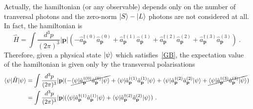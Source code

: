     Actually, the hamiltonian (or any observable) depends only on the number of tranversal photons and the zero-norm $\vert S\rangle - \vert L\rangle$ photons are not considered at all. In fact, the hamiltonian is 
    \begin{equation*}
        \hat H = \int \frac{d^3 p}{(2\pi)^3} |\mathbf p| ( - \hat a_{\mathbf p}^{\dagger (0)} \hat a_{\mathbf p}^{(0)} + \hat a_{\mathbf p}^{\dagger (1)} \hat a_{\mathbf p}^{(1)} + \hat a_{\mathbf p}^{\dagger (2)} \hat a_{\mathbf p}^{(2)} + \hat a_{\mathbf p}^{\dagger (3)} \hat a_{\mathbf p}^{(3)})  ~.
    \end{equation*}
    Therefore, given a physical state $\vert\psi\rangle$ which satisfies~\eqref{GB}, the expectation value of the hamiltonian is given only by the transversal polarisations
    \begin{equation*}
    \begin{aligned}
        \langle\psi\vert \hat H \vert\psi\rangle & = \int \frac{d^3 p}{(2\pi)^3} |\mathbf p| ( - \cancel{\langle\psi\vert \hat a_{\mathbf p}^{\dagger (0)} \hat a_{\mathbf p}^{(0)} \vert\psi\rangle} + \langle\psi\vert \hat a_{\mathbf p}^{\dagger (1)} \hat a_{\mathbf p}^{(1)} \vert\psi\rangle + \langle\psi\vert \hat a_{\mathbf p}^{\dagger (2)} \hat a_{\mathbf p}^{(2)} \vert\psi\rangle + \cancel{\langle\psi\vert \hat a_{\mathbf p}^{\dagger (3)} \hat a_{\mathbf p}^{(3)} \vert\psi\rangle} ) \\ & = \int \frac{d^3 p}{(2\pi)^3} |\mathbf p| ( \langle\psi\vert \hat a_{\mathbf p}^{\dagger (1)} \hat a_{\mathbf p}^{(1)} \vert\psi\rangle + \langle\psi\vert \hat a_{\mathbf p}^{\dagger (2)} \hat a_{\mathbf p}^{(2)} \vert\psi\rangle ) ~.
    \end{aligned}
    \end{equation*}
